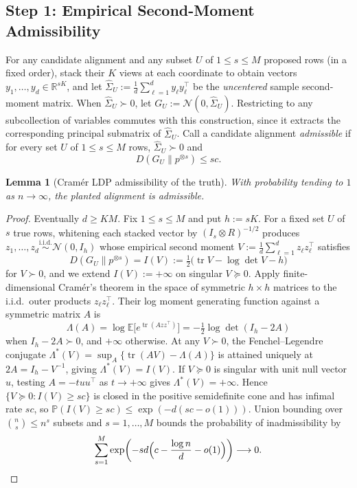 \documentclass[11pt]{article}
\theoremstyle{plain}
\newtheorem{lemma}[theorem]{Lemma}
\theoremstyle{definition}
\theoremstyle{remark}
\DeclareMathOperator{\tr}{tr}
\begin{document}
\subsection{Step 1: Empirical Second-Moment Admissibility}

For any candidate alignment and any subset $U$ of $1 \le s \le M$ proposed rows (in a fixed order), stack their $K$ views at each coordinate to obtain vectors $y_1, \dots, y_d \in \mathbb{R}^{sK}$, and let $\widehat{\Sigma}_U := \frac{1}{d}\sum_{\ell=1}^d y_\ell y_\ell^\top$ be the \emph{uncentered} sample second-moment matrix.
When $\widehat{\Sigma}_U \succ 0$, let $G_U := \mathcal{N}(0, \widehat{\Sigma}_U)$.
Restricting to any subcollection of variables commutes with this construction, since it extracts the corresponding principal submatrix of $\widehat{\Sigma}_U$.
Call a candidate alignment \emph{admissible} if for every set $U$ of $1 \le s \le M$ rows, $\widehat{\Sigma}_U \succ 0$ and
\begin{equation}\label{eq:admissible}
D(G_U \| p^{\otimes s}) \le s c.
\end{equation}

\begin{lemma}[Cram\'er LDP admissibility of the truth]\label{lem:cramer}
With probability tending to $1$ as $n \to \infty$, the planted alignment is admissible.
\end{lemma}

\begin{proof}
Eventually $d \ge KM$.
Fix $1 \le s \le M$ and put $h := sK$.
For a fixed set $U$ of $s$ true rows, whitening each stacked vector by $(I_s \otimes R)^{-1/2}$ produces $z_1, \dots, z_d \stackrel{\text{i.i.d.}}{\sim} \mathcal{N}(0, I_h)$ whose empirical second moment $V := \frac{1}{d}\sum_{\ell=1}^d z_\ell z_\ell^\top$ satisfies
\[
D(G_U \| p^{\otimes s}) = I(V) := \tfrac{1}{2}\bigl(\tr V - \log\det V - h\bigr)
\]
for $V \succ 0$, and we extend $I(V) := +\infty$ on singular $V \succeq 0$.
Apply finite-dimensional Cram\'er's theorem in the space of symmetric $h \times h$ matrices to the i.i.d.\ outer products $z_\ell z_\ell^\top$.
Their log moment generating function against a symmetric matrix $A$ is
\[
\Lambda(A) = \log \mathbb{E}\bigl[e^{\tr(A z z^\top)}\bigr] = -\tfrac{1}{2}\log\det(I_h - 2A)
\]
when $I_h - 2A \succ 0$, and $+\infty$ otherwise.
At any $V \succ 0$, the Fenchel--Legendre conjugate $\Lambda^*(V) = \sup_A \{\tr(AV) - \Lambda(A)\}$ is attained uniquely at $2A = I_h - V^{-1}$, giving $\Lambda^*(V) = I(V)$.
If $V \succeq 0$ is singular with unit null vector $u$, testing $A = -t u u^\top$ as $t \to +\infty$ gives $\Lambda^*(V) = +\infty$.
Hence $\{V \succeq 0 : I(V) \ge sc\}$ is closed in the positive semidefinite cone and has infimal rate $sc$, so $\mathbb{P}(I(V) \ge sc) \le \exp(-d(sc - o(1)))$.
Union bounding over $\binom{n}{s} \le n^s$ subsets and $s = 1, \dots, M$ bounds the probability of inadmissibility by
\[
\sum_{s=1}^M \exp\!\left(-sd\Bigl(c - \frac{\log n}{d} - o(1)\Bigr)\right) \longrightarrow 0. \qedhere
\]
\end{proof}
\end{document}
